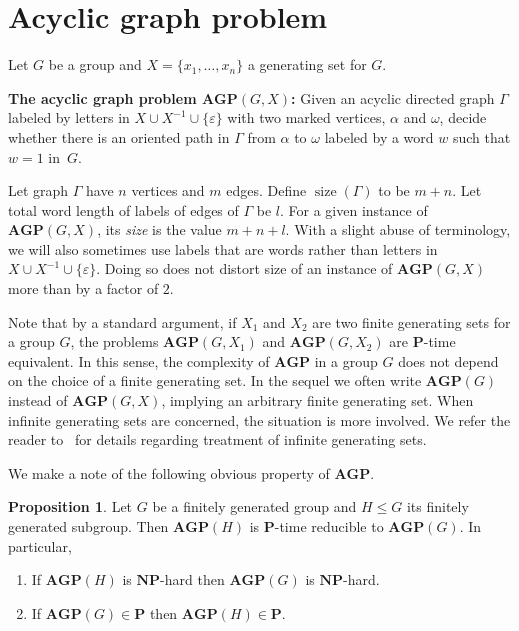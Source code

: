 \documentclass[10pt]{amsart}
\theoremstyle{definition}
\newtheorem{proposition}[theorem]{Proposition}
\DeclareMathOperator{\size}{{size}}
\def\P{{\mathbf{P}}}
\def\NP{{\mathbf{NP}}}
\def\AGP{{\mathbf{AGP}}}
\begin{document}
\section{Acyclic graph problem}\label{sec:agp}
Let $G$ be a group and $X=\{x_1,\ldots,x_n\}$ a generating set for $G$.

%

\medskip
\noindent
{\bf The acyclic graph problem $\AGP(G,X)$\index{$\AGP(G,X)$}:}
Given an acyclic directed graph $\Gamma$ labeled by letters in $X\cup X^{-1}\cup \{\varepsilon\}$ with two marked vertices, $\alpha$ and $\omega$, decide whether there is an oriented path in $\Gamma$ from $\alpha$ to $\omega$ labeled by a word $w$ such that $w=1$ in~$G$.

\medskip
Let graph $\Gamma$ have $n$ vertices and $m$ edges. Define $\size(\Gamma)$ to be $m+n$. Let total word length of labels of edges of $\Gamma$ be $l$. For a given instance of $\AGP(G,X)$, its {\em size} is the value $m+n+l$. With a slight abuse of terminology, we will also sometimes use labels that are words rather than letters in $X\cup X^{-1}\cup\{\varepsilon\}$. Doing so does not distort size of an instance of $\AGP(G,X)$ more than by a factor of $2$.

Note that by a standard argument, if $X_1$ and $X_2$ are two finite generating sets for a group $G$, the problems $\AGP(G,X_1)$ and $\AGP(G,X_2)$ are $\P$-time equivalent. In this sense, the complexity  of $\AGP$ in a group $G$ does not depend on the choice of a finite generating set. In the sequel we often write $\AGP(G)$ instead of $\AGP(G,X)$, implying an arbitrary finite generating set.
When infinite generating sets are concerned, the situation is more involved. We refer the reader to~\cite{Miasnikov-Nikolaev-Ushakov:2014a} for details regarding treatment of infinite generating sets.

We make a note of the following obvious property of $\AGP$.

\begin{proposition}\label{pr:subgroup}
Let $G$ be a finitely generated group and $H\le G$ its finitely generated subgroup. Then $\AGP(H)$ is $\P$-time reducible to $\AGP(G)$. In particular,
\begin{enumerate}
\item If $\AGP(H)$ is $\NP$-hard then $\AGP(G)$ is $\NP$-hard.
\item If $\AGP(G)\in \P$ then $\AGP(H)\in \P$.
\end{enumerate}
\end{proposition}
\end{document}
